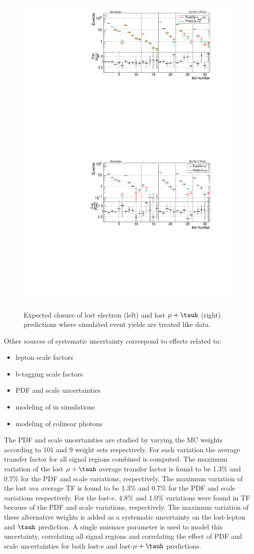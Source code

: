 \begin{figure}
\centering
\includegraphics[width=0.48\linewidth]{../Figures/Chap3/SUSY_Photon_MET_JbJ_18Aug17/LostMu_Closure/AllSBins_v7_Mu0AllSBins_v7_Mu1.pdf}
\includegraphics[width=0.48\linewidth]{../Figures/Chap3/SUSY_Photon_MET_JbJ_18Aug17/LostEle_Closure/AllSBins_v7_Ele0AllSBins_v7_Ele1.pdf}
\captionsetup{width=.9\linewidth}
\caption[Closure for lost lepton and \tauh]{Expected closure of lost electron (left) and lost $\mu+\tauh$ (right) predictions
where simulated event yields are treated like data.}
\label{fig:lost_lepton_closure}
\end{figure}

Other sources of systematic uncertainty correspond to effects related to:
\begin{itemize}
  \item lepton scale factors
  \item b-tagging scale factors
  \item PDF and scale uncertainties
  \item modeling of \mt in simulations
  \item modeling of colinear photons 
\end{itemize}

The PDF and scale uncertainties are studied by varying the MC weights according
to 101 and 9 weight sets respectively.  For each variation the average transfer factor for
all signal regions combined is computed.  
The maximum variation of the lost $\mu+\tauh$
average transfer factor is found to be 1.3\% and 0.7\% for the PDF and scale variations, 
respectively.  
The maximum variation of the lost $mu$ average TF is found to be 1.3\% and 0.7\% for the PDF and scale variations respectively.
For the lost-e, 4.8\% and 1.0\% variations were found in TF because of the PDF and scale variations, respectively.
The maximum variation of these alternative weights is added as a systematic 
uncertainty on the lost-lepton and $\tauh$ prediction. A single nuisnace parameter
is used to model this uncertainty, correlating all signal regions and correlating
the effect of PDF and scale uncertainties for both lost-e and lost-$\mu+\tauh$
predictions. 

